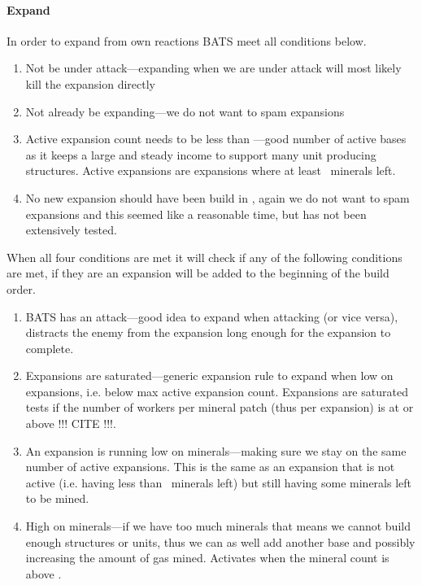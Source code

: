 \paragraph{Expand}
In order to expand from own reactions BATS meet all conditions below.
\begin{enumerate}
	\item Not be under attack—expanding when we are under attack will most likely kill the expansion directly
	\item Not already be expanding—we do not want to spam expansions
	\item Active expansion count needs to be less than \commanderExpansionActiveMax—good number of active bases as it keeps a large and steady income to support many unit producing structures. Active expansions are expansions where at least \classificationExpansionExpansionMineralsLow~minerals left.
	\item No new expansion should have been build in \commanderExpansionIntervalMin, again we do not want to spam expansions and this seemed like a reasonable time, but has not been extensively tested.
\end{enumerate}
When all four conditions are met it will check if any of the following conditions are met, if they are an expansion will be added to the beginning of the build order.
\begin{enumerate}
	\item BATS has an attack—good idea to expand when attacking (or vice versa), distracts the enemy from the expansion long enough for the expansion to complete\cite{day9}.
	\item Expansions are saturated—generic expansion rule to expand when low on expansions, i.e. below max active expansion count. Expansions are saturated tests if the number of workers per mineral patch (thus per expansion) is at or above \classificationExpansionWorkersPerMineralSaturation !!! CITE !!!. %
	\item An expansion is running low on minerals—making sure we stay on the same number of active expansions. This is the same as an expansion that is not active (i.e. having less than \classificationExpansionExpansionMineralsLow~minerals left) but still having some minerals left to be mined.
	\item High on minerals—if we have too much minerals that means we cannot build enough structures or units, thus we can as well add another base and possibly increasing the amount of gas mined. Activates when the mineral count is above \classificationHighOnMinerals.
\end{enumerate}

